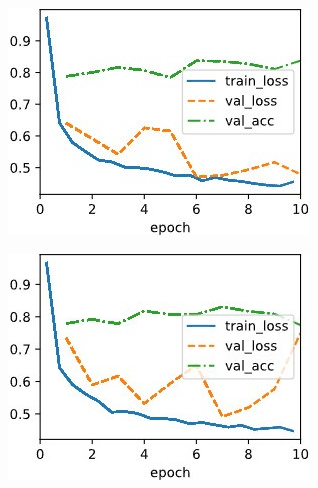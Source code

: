 \documentclass{article}
\begin{document}
\begin{figure}[ht]
\begin{center}\centering
   \begin{subfigure}[b]{0.3\columnwidth}\centering
      \includegraphics[width=\columnwidth]{img/lr0.2 sgd.jpg}
   \end{subfigure}
   \hfill
   \begin{subfigure}[b]{0.3\columnwidth}\centering
      \includegraphics[width=\columnwidth]{img/lr0.2 gravity.jpg}
   \end{subfigure}
   \hfill
   \begin{subfigure}[b]{0.3\columnwidth}\centering

\end{subfigure}
\end{center}
\end{figure}
\end{document}
